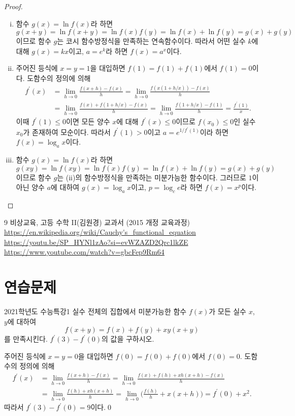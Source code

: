 \documentclass{article}
\begin{document}
\begin{proof}
	\phantom{}
	\begin{enumerate}[(i)]
		\item 함수 $g(x)=\ln f(x)$라 하면
			\[
				g(x+y)=\ln f(x+y)=\ln f(x)f(y)=\ln f(x)+\ln f(y)=g(x)+g(y)
			\]
			이므로 함수 $g$는 코시 함수방정식을 만족하는 연속함수이다. 따라서 어떤 실수 $k$에 대해 $g(x)=kx$이고, $a=e^k$라 하면 $f(x)=a^x$이다.
		\item 주어진 등식에 $x=y=1$을 대입하면 $f(1)=f(1)+f(1)$에서 $f(1)=0$이다. 도함수의 정의에 의해
			\begin{align*}
				f^\prime(x)&=\lim\limits_{h\to0}\frac{f(x+h)-f(x)}{h}=\lim\limits_{h\to0}\frac{f(x(1+h/x))-f(x)}{h}\\[3pt]
				&=\lim\limits_{h\to0}\frac{f(x)+f(1+h/x)-f(x)}{h}=\lim\limits_{h\to0}\frac{f(1+h/x)-f(1)}{h}=\frac{f^\prime(1)}{x}.
			\end{align*}
			이때 $f^\prime(1)\leq0$이면 모든 양수 $x$에 대해 $f^\prime(x)\leq0$이므로 $f(x_0)\leq0$인 실수 $x_0$가 존재하여 모순이다. 따라서 $f^\prime(1)>0$이고 $a=e^{1/f^\prime(1)}$이라 하면 $f(x)=\log_ax$이다.
		\item 함수 $g(x)=\ln f(x)$라 하면
			\[
				g(xy)=\ln f(xy)=\ln f(x)f(y)=\ln f(x)+\ln f(y)=g(x)+g(y)
			\]
			이므로 함수 $g$는 (ii)의 함수방정식을 만족하는 미분가능한 함수이다. 그러므로 $1$이 아닌 양수 $a$에 대하여 $g(x)=\log_ax$이고, $p=\log_ce$라 하면 $f(x)=x^p$이다.\qedhere
	\end{enumerate}
\end{proof}

\begin{thebibliography}{9}
	비상교육, 고등 수학 II(김원경) 교과서 (2015 개정 교육과정)
	\url{https://en.wikipedia.org/wiki/Cauchy's_functional_equation}
	\url{https://youtu.be/SP_HYNl1zAo?si=evWZAZD2Qrc1lkZE}
	\url{https://www.youtube.com/watch?v=gbcFep9Rm64}
\end{thebibliography}

\newpage
\section{연습문제}
\begin{prob}{2021학년도 수능특강}{1}
	실수 전체의 집합에서 미분가능한 함수 $f(x)$가 모든 실수 $x$, $y$에 대하여
	\[
		f(x+y)=f(x)+f(y)+xy(x+y)
	\]
	를 만족시킨다. $f^\prime(3)-f^\prime(0)$의 값을 구하시오.
\end{prob}

\begin{sol}[정석 풀이]
	주어진 등식에 $x=y=0$을 대입하면 $f(0)=f(0)+f(0)$에서 $f(0)=0$. 도함수의 정의에 의해
	\begin{align*}
		f^\prime(x)&=\lim\limits_{h\to0}\frac{f(x+h)-f(x)}{h}=\lim\limits_{h\to0}\frac{f(x)+f(h)+xh(x+h)-f(x)}{h}\\[3pt]
		&=\lim\limits_{h\to0}\frac{f(h)+xh(x+h)}{h}=\lim\limits_{h\to0}\biggl(\frac{f(h)}{h}+x(x+h)\biggr)=f^\prime(0)+x^2.
	\end{align*}
	따라서 $f^\prime(3)-f^\prime(0)=9$이다.\qed
\end{sol}
\end{document}
